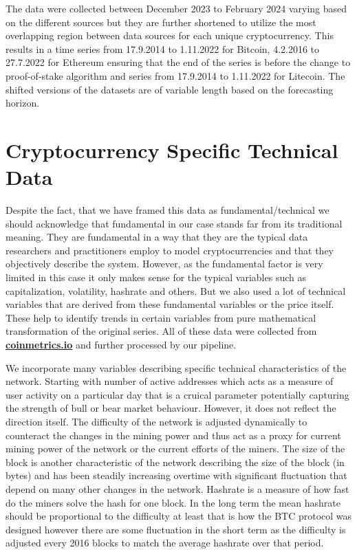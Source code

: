 The data were collected between December 2023 to February 2024 varying 
based on
the different sources but they are further shortened to utilize the most
overlapping region between data sources for each unique cryptocurrency.
This results in a time series from 17.9.2014 to 1.11.2022 for Bitcoin, 4.2.2016
to 27.7.2022 for Ethereum ensuring that the end of the series is 
before the change to proof-of-stake algorithm and series from 17.9.2014 to 1.11.2022
for Litecoin. The shifted versions of the datasets are of variable length based
on the forecasting horizon. 
\section{Cryptocurrency Specific Technical Data}

Despite the fact, that we have framed this data as fundamental/technical 
we should acknowledge that fundamental in our case stands far from its 
traditional meaning. They are fundamental in a way that they 
are the typical data researchers and practitioners employ to model cryptocurrencies
and that they objectively describe the system.
However, as the fundamental factor is very limited in this case it only makes sense
for the typical variables such as capitalization, volatility, hashrate and others.
But we also used a lot of technical variables that are derived from these fundamental
variables or the price itself. These help to identify trends in certain 
variables from pure mathematical transformation of the original series. 
All of these data were collected from \textbf{\href{https://coinmetrics.io/}{coinmetrics.io}}
and further processed by our pipeline.


We incorporate many variables describing specific technical characteristics of the network. Starting with number of active addresses
which acts as a measure of user activity on a particular day that is a cruical parameter potentially capturing the strength of 
bull or bear market behaviour. However, it does not reflect the direction itself. The difficulty of the network is
adjusted dynamically to counteract the changes in the mining power and thus act as a proxy for current mining power of the network or the current efforts of the miners. 
The size of the block is another characteristic of the network describing the size of the block (in bytes) and has been steadily increasing overtime
with significant fluctuation that depend on many other changes in the network. Hashrate is a measure of how
fast do the miners solve the hash for one block. In the long term the mean hashrate should be proportional to the difficulty at least that is how the 
\ac{BTC} protocol was designed however there are some fluctuation in the short term as the difficulty is adjusted every 2016 blocks 
to match the average hashrate over that period.


